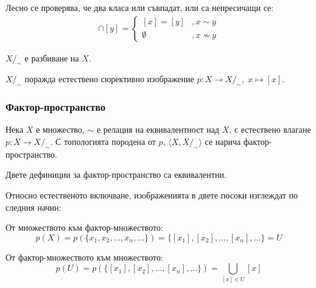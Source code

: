 \begin{fact}
    Лесно се проверява, че два класа или съвпадат, или са непресичащи се:
    \begin{eqnarray}
        [x] \cap [y] = \begin{cases}
            [x] = [y] &, x \sim y\\
            \emptyset &, x \not\sim y
        \end{cases}
    \end{eqnarray}
\end{fact}

\begin{corollary}
    $X/_\sim$ е разбиване на $X$.
\end{corollary}
\begin{corollary}
    $X/_\sim$ поражда естествено сюрективно изображение $p: X \to X/_\sim,\; x \mapsto [x]$.
\end{corollary}

\subsubsection{Фактор-пространство}
\begin{definition}
    Нека $X$ е множество, $\sim$ е релация на еквивалентност над $X$, с естествено влагане $p: X \to X/_\sim$. С топологията породена от $p$, $\langle X, X/_\sim\rangle$ се нарича фактор-пространство.
\end{definition}
\begin{proposition}
    Двете дефиниции за фактор-пространство са еквивалентни.
\end{proposition}
\begin{fact}
    Относно естественото включване, изображенията в двете посоки изглеждат по следния начин:

    От множеството към фактор-множеството:
    \begin{equation}
        p(X) = p(\{x_1, x_2, \dots, x_n, \dots\}) = \{[x_1], [x_2], \dots, [x_n], \dots\} = U
    \end{equation}

    От фактор-множеството към множеството:
    \begin{equation}
        p(U) = p(\{[x_1], [x_2], \dots, [x_n], \dots\}) = \bigcup_{[x] \in U} [x]
    \end{equation}
\end{fact}

